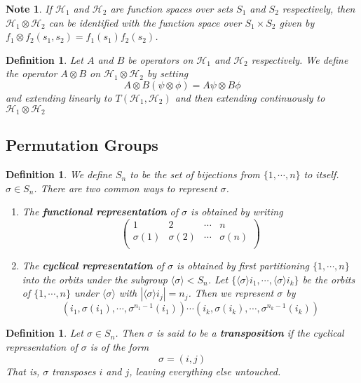 \documentclass[12pt]{amsart}
\newtheorem{defn}[thm]{Definition}
\newtheorem{note}[thm]{Note}
\renewcommand{\r}{\rangle}
\renewcommand{\l}{\langle}
\newcommand{\sig}{\sigma}
\newcommand{\MH}{\mathcal{H}}
\begin{document}
	\begin{note}
		If $\MH_1$ and $\MH_2$ are function spaces over sets $S_1$ and $S_2$ respectively, then $\MH_1 \otimes \MH_2$ can be identified with the function space over $S_1 \times S_2$ given by  $f_1 \otimes f_2(s_1, s_2) = f_1(s_1)f_2(s_2)$.
	\end{note}

	\begin{defn}
		Let $A$ and $B$ be operators on $\MH_1$ and $\MH_2$ respectively. We define the operator $A \otimes B$ on $\MH_1 \otimes \MH_2$ by setting $$A \otimes B (\psi \otimes \phi) = A \psi \otimes B \phi$$ and extending linearly to $T(\MH_1, \MH_2)$ and then extending continuously to $\MH_1 \otimes \MH_2$
	\end{defn}

\newpage
\subsection{Permutation Groups} 

\begin{defn}
	We define $S_n$ to be the set of bijections from $\{1, \cdots, n\}$ to itself. $\sig \in S_n$. There are two common ways to represent $\sig$. 
	\begin{enumerate}
		\item The \textbf{functional representation} of $\sig$ is obtained by writing
		$$\begin{pmatrix}
			1 & 2 & \cdots & n \\
			\sig(1) & \sig(2) & \cdots & \sig(n)\\
		\end{pmatrix}$$
	\item The \textbf{cyclical representation} of $\sig$ is obtained by first partitioning $\{1, \cdots, n\}$ into the orbits under the subgroup $\l \sig \r < S_n$. Let $\{\l \sig \r i_1, \cdots , \l \sig \r i_k\}$ be the orbits of $\{1, \cdots, n\}$ under $\l \sig \r$ with $|\l \sig \r i_j| = n_j$. Then we represent $\sig$ by
	$$(i_1 , \sig(i_1) , \cdots , \sig^{n_1-1}(i_1)) \cdots (i_k , \sig(i_k) , \cdots , \sig^{n_k-1}(i_k)) $$
	\end{enumerate}
\end{defn}

\begin{defn}
	Let $\sig \in S_n$. Then $\sig$ is said to be a \textbf{transposition} if the cyclical representation of $\sig$ is of the form $$\sig = (i,j)$$
	That is, $\sig$ transposes $i$ and $j$, leaving everything else untouched. 
\end{defn}
\end{document}
